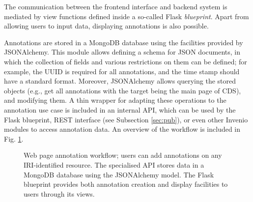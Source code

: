 The communication between the frontend interface and backend system is mediated
by view functions defined inside a so-called Flask \textit{blueprint}. Apart
from allowing users to input data, displaying annotations is also possible.

Annotations are stored in a MongoDB database \cite{ref:mongo} using the
facilities provided by JSONAlchemy. This module allows defining a schema for
JSON documents, in which the collection of fields and various restrictions on
them can be defined; for example, the UUID is required for all annotations, and
the time stamp should have a standard format. Moreover, JSONAlchemy allows
querying the stored objects (e.g., get all annotations with the target being
the main page of CDS), and modifying them. A thin wrapper for adapting these
operations to the annotation use case is included in an internal API, which can
be used by the Flask blueprint, REST interface (see Subsection \ref{sec:pub}),
or even other Invenio modules to access annotation data. An overview of the
workflow is included in Fig. \ref{fig:baseanno}.

\begin{figure}
  \centering
  \caption[Web page annotation workflow]
          {Web page annotation workflow; users can add annotations on any
           IRI-identified resource. The specialised API stores data in a
           MongoDB database using the JSONAlchemy model. The Flask blueprint
           provides both annotation creation and display facilities to users
           through its views.}
  \label{fig:baseanno}
\end{figure}
